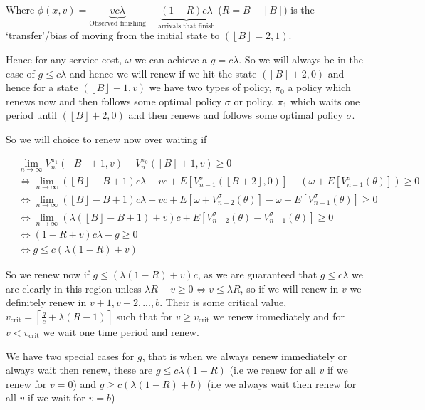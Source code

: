 \documentclass[a4paper,10pt]{article}
\newcommand{\floor}[1]{\left \lfloor #1 \right \rfloor}
\newcommand{\ceil}[1]{\left \lceil #1 \right \rceil}
\theoremstyle{definition}
\theoremstyle{definition}
\theoremstyle{remark}
\theoremstyle{definition}
\begin{document}
Where $\phi(x,v)= \underbrace{v c \lambda}_{\text{Observed finishing}} + \underbrace{(1-R) c \lambda}_{\text{arrivals that finish}}$ ($R=B-\floor{B}$) is the `transfer'/bias of moving from the initial state to $(\floor{B}=2,1)$.

Hence for any service cost, $\omega$ we can achieve a $g= c \lambda$. So we will always be in the case of $g \leq c \lambda$ and hence we will renew if we hit the state $(\floor{B}+2,0)$ and hence for a state $(\floor{B}+1,v)$ we have two types of policy, $\pi_{0}$ a policy which renews now and then follows some optimal policy $\sigma$ or policy, $\pi_{1}$ which waits one period until $(\floor{B}+2,0)$ and then renews and follows some optimal policy $\sigma$.

So we will choice to renew now over waiting if

\begin{align*}
&\lim\limits_{n \rightarrow \infty} V_{n}^{\pi_{1}} (\floor{B}+1,v) - V_{n}^{\pi_{0}}(\floor{B}+1,v) \geq 0 \\
& \iff \lim\limits_{n \rightarrow \infty} (\floor{B}-B+1) c \lambda + v c + E[V_{n-1}^{\sigma}(\floor{B+2},0)] - (\omega + E[V_{n-1}^{\sigma}(\theta)]) \geq 0 \\
& \iff \lim\limits_{n \rightarrow \infty} (\floor{B}-B+1) c \lambda + v c  + E[ \omega + V_{n-2}^{\sigma}(\theta)] - \omega - E[V_{n-1}^{\sigma}(\theta)] \geq 0 \\
& \iff \lim\limits_{n \rightarrow \infty} (\lambda(\floor{B}-B+1)+v) c + E[V_{n-2}^{\sigma}(\theta) - V_{n-1}^{\sigma}(\theta)] \geq 0 \\
& \iff (1-R+v)c \lambda - g \geq 0 \\
& \iff g \leq c (\lambda(1-R)+v) 
\end{align*}

So we renew now if $g \leq (\lambda(1-R)+v)c$, as we are guaranteed that $g \leq c \lambda$ we are clearly in this region unless $\lambda R-v \geq 0 \iff v \leq \lambda R $, so if we will renew in $v$ we definitely renew in $v+1,v+2,...,b$. Their is some critical value, $v_{\text{crit}}=\ceil{\frac{g}{c}+ \lambda (R-1)}$ such that for $v \geq v_{\text{crit}}$ we renew immediately and for $v < v_{\text{crit}}$ we wait one time period and renew.

We have two special cases for $g$, that is when we always renew immediately or always wait then renew, these are $g \leq  c \lambda(1-R)$ (i.e we renew for all $v$ if we renew for $v=0$) and $g \geq c (\lambda(1-R)+b)$ (i.e we always wait then renew for all $v$ if we wait for $v=b$)
\end{document}
